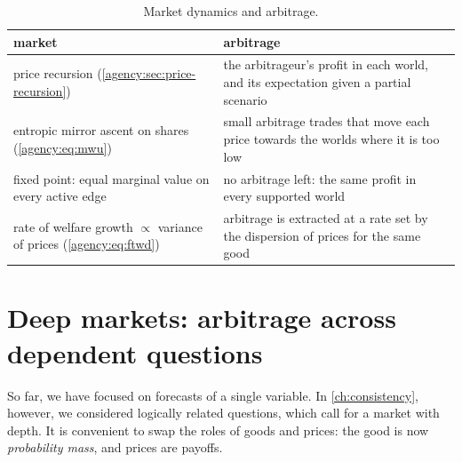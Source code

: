 \begin{draftblock}
\begin{table}[ht]
\centering\small
\begin{tabular}{@{}p{}p{}@{}}
\toprule
market & arbitrage \\
\midrule
price recursion (\cref{agency:sec:price-recursion}) & the arbitrageur's profit in each world, and its expectation given a partial scenario \\
entropic mirror ascent on shares (\cref{agency:eq:mwu}) & small arbitrage trades that move each price towards the worlds where it is too low \\
fixed point: equal marginal value on every active edge & no arbitrage left: the same profit in every supported world \\
rate of welfare growth $\propto$ variance of prices (\cref{agency:eq:ftwd}) & arbitrage is extracted at a rate set by the dispersion of prices for the same good \\
\bottomrule
\end{tabular}
\caption{Market dynamics and arbitrage.}\label{arb:tab:dictionary}
\end{table}

\section{Deep markets: arbitrage across dependent questions}\label{arb:sec:deep}

So far, we have focused on forecasts of a single variable. In \cref{ch:consistency}, however, we considered logically related questions, which call for a market with depth. It is convenient to swap the roles of goods and prices: the good is now \emph{probability mass}, and prices are payoffs.


\end{draftblock}
